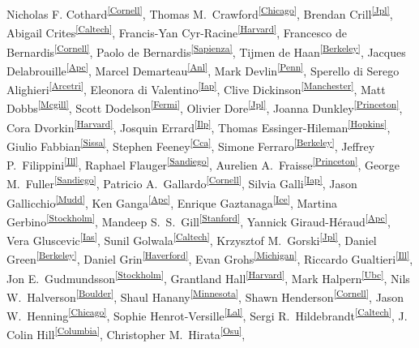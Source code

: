 Nicholas F. Cothard\textsuperscript{\ref{Cornell}}, 
Thomas M.~Crawford\textsuperscript{\ref{Chicago}}, 
Brendan Crill\textsuperscript{\ref{Jpl}},
Abigail Crites\textsuperscript{\ref{Caltech}},
Francis-Yan Cyr-Racine\textsuperscript{\ref{Harvard}},
Francesco de Bernardis\textsuperscript{\ref{Cornell}}, 
Paolo de Bernardis\textsuperscript{\ref{Sapienza}},
Tijmen de Haan\textsuperscript{\ref{Berkeley}},
Jacques Delabrouille\textsuperscript{\ref{Apc}}, 
Marcel Demarteau\textsuperscript{\ref{Anl}},
Mark Devlin\textsuperscript{\ref{Penn}}, 
Sperello di Serego Alighieri\textsuperscript{\ref{Arcetri}}, 
Eleonora di Valentino\textsuperscript{\ref{Iap}},
Clive Dickinson\textsuperscript{\ref{Manchester}},
Matt Dobbs\textsuperscript{\ref{Mcgill}},
Scott Dodelson\textsuperscript{\ref{Fermi}}, 
Olivier Dore\textsuperscript{\ref{Jpl}},
Joanna Dunkley\textsuperscript{\ref{Princeton}},
Cora Dvorkin\textsuperscript{\ref{Harvard}},
Josquin Errard\textsuperscript{\ref{Ilp}},
Thomas Essinger-Hileman\textsuperscript{\ref{Hopkins}},
Giulio Fabbian\textsuperscript{\ref{Sissa}},
Stephen Feeney\textsuperscript{\ref{Cca}},
Simone Ferraro\textsuperscript{\ref{Berkeley}}, 
Jeffrey P.~Filippini\textsuperscript{\ref{Ill}},
Raphael Flauger\textsuperscript{\ref{Sandiego}}, 
Aurelien A.~Fraisse\textsuperscript{\ref{Princeton}},
George M.~Fuller\textsuperscript{\ref{Sandiego}},
Patricio A.~Gallardo\textsuperscript{\ref{Cornell}},
Silvia Galli\textsuperscript{\ref{Iap}},
Jason Gallicchio\textsuperscript{\ref{Mudd}},
Ken Ganga\textsuperscript{\ref{Apc}},
Enrique Gaztanaga\textsuperscript{\ref{Ice}},
Martina Gerbino\textsuperscript{\ref{Stockholm}},
Mandeep S.~S.~Gill\textsuperscript{\ref{Stanford}},
Yannick Giraud-Héraud\textsuperscript{\ref{Apc}},
Vera Gluscevic\textsuperscript{\ref{Ias}},
Sunil Golwala\textsuperscript{\ref{Caltech}},
Krzysztof M.~Gorski\textsuperscript{\ref{Jpl}},
Daniel Green\textsuperscript{\ref{Berkeley}},
Daniel Grin\textsuperscript{\ref{Haverford}},
Evan Grohs\textsuperscript{\ref{Michigan}},
Riccardo Gualtieri\textsuperscript{\ref{Ill}}, 
Jon E.~Gudmundsson\textsuperscript{\ref{Stockholm}},
Grantland Hall\textsuperscript{\ref{Harvard}},
Mark Halpern\textsuperscript{\ref{Ubc}},
Nils W.~Halverson\textsuperscript{\ref{Boulder}},
Shaul Hanany\textsuperscript{\ref{Minnesota}},
Shawn Henderson\textsuperscript{\ref{Cornell}},
Jason W.~Henning\textsuperscript{\ref{Chicago}},
Sophie Henrot-Versille\textsuperscript{\ref{Lal}},
Sergi R.~Hildebrandt\textsuperscript{\ref{Caltech}},
J. Colin Hill\textsuperscript{\ref{Columbia}},
Christopher M.~Hirata\textsuperscript{\ref{Osu}},

